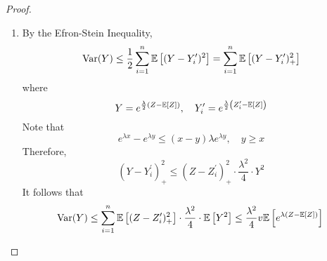 \begin{enumerate}[label=\arabic{*}.]
\begin{proof}
\begin{enumerate}[label=\Roman*.]
\begin{proof}[Proof of the Claim]
\begin{equation*}
			        \begin{aligned}
			        	g(\lambda) &\leq -\sum_{i=0}^\infty2^i\log \bc{1-\frac{\lambda^2}{2^{2(i+1)}}v} \\
			        	&= \sum_{i=0}^\infty2^{-i}\bc{-2^{2i}\log \bc{1-\frac{\lambda^2}{4\cdot 2^{2i}}v}} 
			        \end{aligned}
			    \end{equation*}
			    Consider the function $\log (1 - cx)$ with $c > 0$,
			    \begin{equation*}
			        -\frac{\log(1-cx)}{x} \leq -\log (1 - c),\quad x \in [0,1]
			    \end{equation*}
			    Therefore,
			    \begin{equation*}
			        g(\lambda) \leq -\sum_{i=0}^\infty2^{-i} \log(1- \frac{\lambda^2v}{4})~\Rightarrow~g(\sqrt{v}) \leq \log \frac{16}{9} \qedhere
			    \end{equation*}
		    \end{proof}
		    Under this claim, because
		    \begin{equation*}
		        \Pb\bc{Z - \E[Z] > t} \leq e^{ \psi_{Z - \E[Z]}(\lambda)}e^{-\lambda t}
		    \end{equation*}
		    by taking $\lambda = \frac{1}{\sqrt{v}}$, we have
		    \begin{equation*}
		         \Pb\bc{Z - \E[Z] > t} \leq \frac{16}{9}e^{-\frac{t}{\sqrt{v}}}
		    \end{equation*}
		    which is desired result. 

		    \item By the Efron-Stein Inequality,
		    \begin{equation*}
		        \operatorname{Var}(Y) \leq \frac{1}{2}\sum_{i=1}^n\mathbb{E}\left[(Y-Y_i^\prime)^2\right] = \sum_{i=1}^n\mathbb{E}\left[(Y-Y_i^\prime)_+^2\right]
		    \end{equation*}
		    where
		    \begin{equation*}
		        Y= e^{\frac{\lambda}{2}\left(Z - \mathbb{E}\left[Z\right]\right)},\quad Y_i^\prime= e^{\frac{\lambda}{2}\left(Z_i^\prime - \mathbb{E}\left[Z\right]\right)}
		    \end{equation*}
		    Note that 
		    \begin{equation*}
		        e^{\lambda x} - e^{\lambda y} \leq (x-y)\lambda e^{\lambda y},\quad y \geq x
		    \end{equation*}
		    Therefore,
			\begin{equation*}
			    (Y-Y_i^\prime)_+^2 \leq (Z-Z_i^\prime)_+^2\cdot\frac{\lambda^2}{4}\cdot Y^2
			\end{equation*}
			It follows that
			\begin{equation*}
			    \operatorname{Var}(Y) \leq \sum_{i=1}^n\mathbb{E}\left[(Z-Z_i^\prime)_+^2\right] \cdot\frac{\lambda^2}{4}\cdot \mathbb{E}\left[Y^2\right] \leq \frac{\lambda^2}{4} v \mathbb{E}\left[ e^{\lambda(Z - \mathbb{E}[Z])}\right] \qedhere
			\end{equation*}
		\end{enumerate}
	\end{proof}
	
\end{enumerate}

